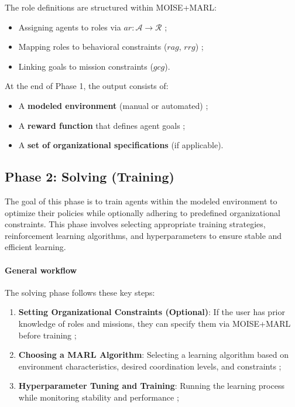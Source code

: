 \documentclass[pdflatex,sn-mathphys-num]{sn-jnl}%
\theoremstyle{thmstyleone}%
\theoremstyle{thmstyletwo}%
\theoremstyle{thmstylethree}%
\begin{document}
The role definitions are structured within MOISE+MARL:
\begin{itemize}
    \item Assigning agents to roles via $ar: \mathcal{A} \to \mathcal{R}$ ;
    \item Mapping roles to behavioral constraints ($rag$, $rrg$) ;
    \item Linking goals to mission constraints ($gcg$).
\end{itemize}

At the end of Phase 1, the output consists of:
\begin{itemize}
    \item A \textbf{modeled environment} (manual or automated) ;
    \item A \textbf{reward function} that defines agent goals ;
    \item A \textbf{set of organizational specifications} (if applicable).
\end{itemize}


\subsection{Phase 2: Solving (Training)}

The goal of this phase is to train agents within the modeled environment to optimize their policies while optionally adhering to predefined organizational constraints. This phase involves selecting appropriate training strategies, reinforcement learning algorithms, and hyperparameters to ensure stable and efficient learning.

\paragraph{\textbf{General workflow}}
The solving phase follows these key steps:
\begin{enumerate}
    \item \textbf{Setting Organizational Constraints (Optional)}: If the user has prior knowledge of roles and missions, they can specify them via MOISE+MARL before training ;
    \item \textbf{Choosing a MARL Algorithm}: Selecting a learning algorithm based on environment characteristics, desired coordination levels, and constraints ;
    \item \textbf{Hyperparameter Tuning and Training}: Running the learning process while monitoring stability and performance ;
\end{enumerate}
\end{document}
